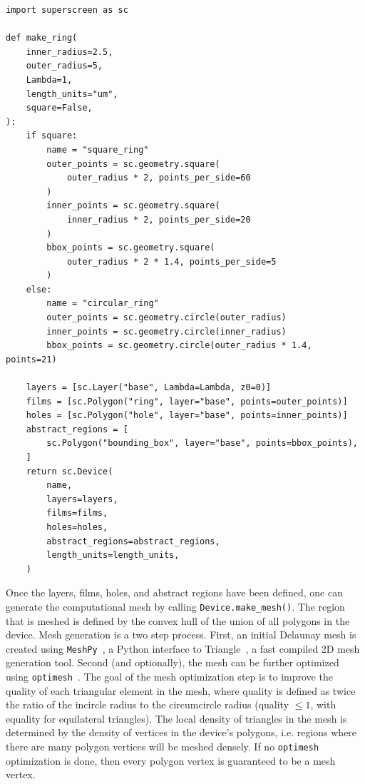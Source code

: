 \documentclass[preprint,12pt]{elsarticle}
\newenvironment{code}{\captionsetup{type=listing}}{}
\begin{document}
\begin{code}
\begin{verbatim}
import superscreen as sc

def make_ring(
    inner_radius=2.5,
    outer_radius=5,
    Lambda=1,
    length_units="um",
    square=False,
):
    if square:
        name = "square_ring"
        outer_points = sc.geometry.square(
            outer_radius * 2, points_per_side=60
        )
        inner_points = sc.geometry.square(
            inner_radius * 2, points_per_side=20
        )
        bbox_points = sc.geometry.square(
            outer_radius * 2 * 1.4, points_per_side=5
        )
    else:
        name = "circular_ring"
        outer_points = sc.geometry.circle(outer_radius)
        inner_points = sc.geometry.circle(inner_radius)
        bbox_points = sc.geometry.circle(outer_radius * 1.4, points=21)

    layers = [sc.Layer("base", Lambda=Lambda, z0=0)]
    films = [sc.Polygon("ring", layer="base", points=outer_points)]
    holes = [sc.Polygon("hole", layer="base", points=inner_points)]
    abstract_regions = [
        sc.Polygon("bounding_box", layer="base", points=bbox_points),
    ]
    return sc.Device(
        name,
        layers=layers,
        films=films,
        holes=holes,
        abstract_regions=abstract_regions,
        length_units=length_units,
    )
\end{verbatim}
\label{code:device}
\end{code}

Once the layers, films, holes, and abstract regions have been defined, one can generate the computational mesh by calling \texttt{Device.make_mesh()}. The region that is meshed is defined by the convex hull of the union of all polygons in the device. Mesh generation is a two step process. First, an initial Delaunay mesh is created using \texttt{MeshPy}~\cite{Klockner}, a Python interface to Triangle~\cite{shewchuk96b, Shewchuk}, a fast compiled 2D mesh generation tool. Second (and optionally), the mesh can be further optimized using \texttt{optimesh}~\cite{nico_schlomer_adam_dobrawy_2021}. The goal of the mesh optimization step is to improve the quality of each triangular element in the mesh, where quality is defined as twice the ratio of the incircle radius to the circumcircle radius (quality $\leq1$, with equality for equilateral triangles). The local density of triangles in the mesh is determined by the density of vertices in the device's polygons, i.e. regions where there are many polygon vertices will be meshed densely. If no \texttt{optimesh} optimization is done, then every polygon vertex is guaranteed to be a mesh vertex.
\end{document}
